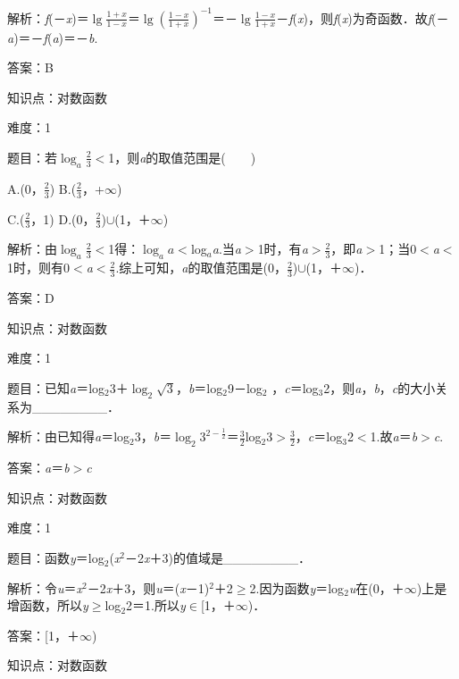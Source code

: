 \documentclass{article} %
\begin{document}
解析：\textit{f}(－\textit{x})＝$\lg\frac{1+x}{1-x}$＝$\lg(\frac{1-x}{1+x})^{-1}$＝－$\lg\frac{1-x}{1+x}$－\textit{f}(\textit{x})，则\textit{f}(\textit{x})为奇函数．故\textit{f}(－\textit{a})＝－\textit{f}(\textit{a})＝－\textit{b}.

答案：B

知识点：对数函数

难度：1

题目：若$\log_a \frac{2}{3}$$\mathrm{<}$1，则\textit{a}的取值范围是(　　)

A.(0，$\frac{2}{3}$)   B.($\frac{2}{3}$，+$\infty$)

C.($\frac{2}{3}$，1)   D.(0，$\frac{2}{3}$)$\mathrm{\cup}$(1，＋$\mathrm{\infty}$)

解析：由$\log_a \frac{2}{3}$$\mathrm{<}$1得：$\log_a a$$\mathrm{<}$log\textit{${}_{a}$a}.当\textit{a}$\mathrm{>}$1时，有\textit{a}$\mathrm{>}$$\frac{2}{3}$，即\textit{a}$\mathrm{>}$1；当0$\mathrm{<}$\textit{a}$\mathrm{<}$1时，则有0$\mathrm{<}$\textit{a}$\mathrm{<}$$\frac{2}{3}$.综上可知，\textit{a}的取值范围是(0，$\frac{2}{3}$)$\mathrm{\cup}$(1，＋$\mathrm{\infty}$)．

答案：D

知识点：对数函数

难度：1

题目：已知\textit{a}＝log${}_{2}$3＋$\log_2 \sqrt{3}$，\textit{b}＝log${}_{2}$9－log${}_{2}$ ，\textit{c}＝log${}_{3}$2，则\textit{a}，\textit{b}，\textit{c}的大小关系为\_\_\_\_\_\_\_\_．

解析：由已知得\textit{a}＝log${}_{2}$3，\textit{b}＝$\log_2 3^{2-\frac{1}{2}}$＝$\frac{3}{2}$log${}_{2}$3$\mathrm{>}$$\frac{3}{2}$，\textit{c}＝log${}_{3}$2$\mathrm{<}$1.故\textit{a}＝\textit{b}$\mathrm{>}$\textit{c}.

答案：\textit{a}＝\textit{b}$\mathrm{>}$\textit{c}

知识点：对数函数

难度：1

题目：函数\textit{y}＝log${}_{2}$(\textit{x}${}^{2}$－2\textit{x}＋3)的值域是\_\_\_\_\_\_\_\_．

解析：令\textit{u}＝\textit{x}${}^{2}$－2\textit{x}＋3，则\textit{u}＝(\textit{x}－1)${}^{2}$＋2$\mathrm{\ge}$2.因为函数\textit{y}＝log${}_{2}$\textit{u}在(0，＋$\mathrm{\infty}$)上是增函数，所以\textit{y}$\mathrm{\ge}$log${}_{2}$2＝1.所以\textit{y}$\mathrm{\in}$[1，＋$\mathrm{\infty}$)．

答案：[1，＋$\mathrm{\infty}$)

知识点：对数函数
\end{document}
